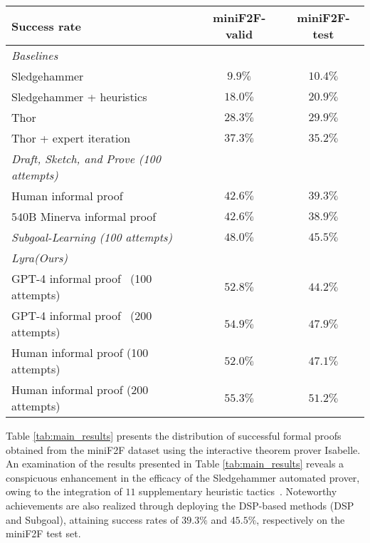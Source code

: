 \documentclass{article} \usepackage{iclr2024_conference,times}
\def\miniff{miniF2F\xspace}
\def\shortname{Lyra\xspace}
\begin{document}
\begin{table*}[t]
\begin{center}
\caption{
\small
\textbf{Proving success rates on the \miniff dataset with Isabelle.} 
The table displays the success rates of previous works and the \shortname, using both human and GPT-4 informal proofs. The highest success rates for each set are highlighted in bold.
}
\label{tab:main_results} \small
\begin{tabular}{lcc}
    \toprule
    Success rate & \miniff-valid & \miniff-test\\
    \midrule
    \multicolumn{1}{l}{\textit{Baselines}} \\
    \midrule
    Sledgehammer~\citep{paulson2010three}              & $9.9\%$ & $10.4\%$ \\
    Sledgehammer + heuristics~\citep{jiang2023draft} & $18.0\%$ & $20.9\%$ \\
    Thor~\citep{jiang2022thor} & $28.3\%$ & $29.9\%$ \\
    Thor + expert iteration~\citep{wu2022autoformalization} & $37.3\%$ & $35.2\%$ \\
    \midrule
    \multicolumn{1}{l}{\textit{Draft, Sketch, and Prove (100 attempts)}}~\citep{jiang2023draft} \\
    \midrule
    Human informal proof    & $42.6\%$ & $39.3\%$ \\
    $540$B Minerva informal proof & $42.6\%$ & $38.9\%$ \\
    \midrule
     \textit{Subgoal-Learning (100 attempts)}~\citep{zhao2023decomposing}   & $48.0\%$ & $45.5\%$ \\
    \midrule
    \multicolumn{1}{l}{\textit{\shortname (Ours)}} \\
    \midrule
    GPT-4 informal proof ~(100 attempts)  & $52.8\%$ & $44.2\%$ \\
    GPT-4 informal proof ~(200 attempts)  & $54.9\%$ & $47.9\%$ \\
    Human informal proof (100 attempts)   & $52.0\%$ & $47.1\%$ \\
    Human informal proof (200 attempts)   & $\mathbf{55.3}\%$ & $\mathbf{51.2\%}$ \\
   
    \bottomrule
\end{tabular}
\end{center}
\vspace{-0.1in}
\end{table*}
Table \ref{tab:main_results} presents the distribution of successful formal proofs obtained from the miniF2F dataset using the interactive theorem prover Isabelle. An examination of the results presented in Table \ref{tab:main_results} reveals a conspicuous enhancement in the efficacy of the Sledgehammer automated prover, owing to the integration of $11$ supplementary heuristic tactics~\citep{jiang2023draft}. Noteworthy achievements are also realized through deploying the DSP-based methods (DSP and Subgoal), attaining success rates of $39.3\%$ and $45.5\%$, respectively on the miniF2F test set.
\end{document}
